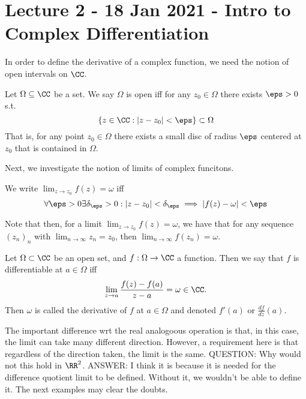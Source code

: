 \section{Lecture 2 - 18 Jan 2021 - Intro to Complex Differentiation}
In order to define the derivative of a complex function, we need the notion of
open intervals on $\CC$.

\begin{definition}
  Let $\Omega\subseteq\CC$ be a set. We say $\Omega$ is open iff for any
  $z_0\in\Omega$ there exists $\eps>0$ s.t. 
  \[\{z\in\CC : |z-z_0| < \eps\} \subset \Omega\]
  That is, for any point $z_0\in\Omega$ there exists a small disc
  of radius $\eps$ centered at $z_0$ that is contained in $\Omega$.
  \label{def:openSet}
\end{definition}
Next, we investigate the notion of limits of complex funcitons. 

\begin{definition}
  We write $\lim_{z\to z_0} f(z)= \omega$ iff
  \[\forall\eps>0 \exists \delta_{\eps}>0 : |z-z_0|<\delta_{\eps}\implies
  |f(z)-\omega| < \eps\]
  \label{def:limitComplexFun}
\end{definition}
Note that then, for a limit $\lim_{z\to z_0} f(z)=\omega$, we have that for any
sequence $(z_n)_n$ with $\lim_{n\to\infty} z_n = z_0$, then
$\lim_{n\to\infty}f(z_n)=\omega$.

\begin{definition}
  Let $\Omega\subset\CC$ be an open set, and $f:\Omega\to\CC$ a function. Then
  we say that $f$ is differentiable at $a\in\Omega$ iff 
  \[\lim_{z\to a} \frac{f(z)-f(a)}{z-a} = \omega \in\CC.\]
  Then $\omega$ is called the derivative of $f$ at $a\in\Omega$ and denoted
  $f'(a)$ or $\frac{df}{dz}(a)$.
  \label{def:derivativeComplex}
\end{definition}
The important difference wrt the real analogoous operation is that, in this
case, the limit can take many different direction. However, a requirement here
is that regardless of the direction taken, the limit is the same.
QUESTION: Why would not this hold in $\RR^2$. ANSWER: I think it is because it
is needed for the difference quotient limit to be defined. Without it, we
wouldn't be able to define it. The next examples may clear the doubts.


